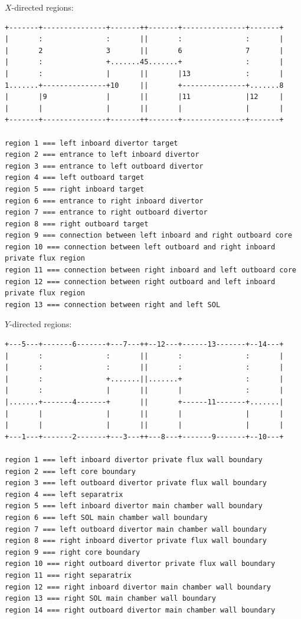\documentclass[a4paper,10pt]{report}
\begin{document}
\clearpage
$X$-directed regions:
\begin{verbatim}
+-------+---------------+-------++-------+---------------+-------+
|       :               :       ||       :               :       |
|       2               3       ||       6               7       |
|       :               +.......45.......+               :       |
|       :               |       ||       |13             :       |
1.......+---------------+10     ||       +---------------+.......8
|       |9              |       ||       |11             |12     |
|       |               |       ||       |               |       |
+-------+---------------+-------++-------+---------------+-------+

region 1 === left inboard divertor target
region 2 === entrance to left inboard divertor
region 3 === entrance to left outboard divertor
region 4 === left outboard target
region 5 === right inboard target
region 6 === entrance to right inboard divertor
region 7 === entrance to right outboard divertor
region 8 === right outboard target
region 9 === connection between left inboard and right outboard core
region 10 === connection between left outboard and right inboard private flux region
region 11 === connection between right inboard and left outboard core
region 12 === connection between right outboard and left inboard private flux region
region 13 === connection between right and left SOL
\end{verbatim}

$Y$-directed regions:
\begin{verbatim}
+---5---+-------6-------+---7---++--12---+------13-------+--14---+
|       :               :       ||       :               :       |
|       :               :       ||       :               :       |
|       :               +.......||.......+               :       |
|       :               |       ||       |               :       |
|.......+-------4-------+       ||       +------11-------+.......|
|       |               |       ||       |               |       |
|       |               |       ||       |               |       |
+---1---+-------2-------+---3---++---8---+-------9-------+--10---+

region 1 === left inboard divertor private flux wall boundary
region 2 === left core boundary
region 3 === left outboard divertor private flux wall boundary
region 4 === left separatrix
region 5 === left inboard divertor main chamber wall boundary
region 6 === left SOL main chamber wall boundary
region 7 === left outboard divertor main chamber wall boundary
region 8 === right inboard divertor private flux wall boundary
region 9 === right core boundary
region 10 === right outboard divertor private flux wall boundary
region 11 === right separatrix
region 12 === right inboard divertor main chamber wall boundary
region 13 === right SOL main chamber wall boundary
region 14 === right outboard divertor main chamber wall boundary
\end{verbatim}
\end{document}

